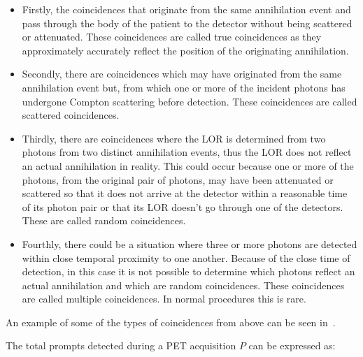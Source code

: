             \begin{itemize}
                \item Firstly, the coincidences that originate from the same annihilation event and pass through the body of the patient to the detector without being scattered or attenuated. These coincidences are called true coincidences as they approximately accurately reflect the position of the originating annihilation.
                
                \item Secondly, there are coincidences which may have originated from the same annihilation event but, from which one or more of the incident photons has undergone Compton scattering before detection. These coincidences are called scattered coincidences.
                
                \item Thirdly, there are coincidences where the \gls{LOR} is determined from two photons from two distinct annihilation events, thus the \gls{LOR} does not reflect an actual annihilation in reality. This could occur because one or more of the photons, from the original pair of photons, may have been attenuated or scattered so that it does not arrive at the detector within a reasonable time of its photon pair or that its \gls{LOR} doesn't go through one of the detectors. %
                These are called random coincidences.
                
                \item Fourthly, there could be a situation where three or more photons are detected within close temporal proximity to one another. Because of the close time of detection, in this case it is not possible to determine which photons reflect an actual annihilation and which are random coincidences. These coincidences are called multiple coincidences. In normal procedures this is rare. %
            \end{itemize}
            
            An example of some of the types of coincidences from above can be seen in~.
            
            The total prompts detected during a \gls{PET} acquisition $P$ can be expressed as:
            
